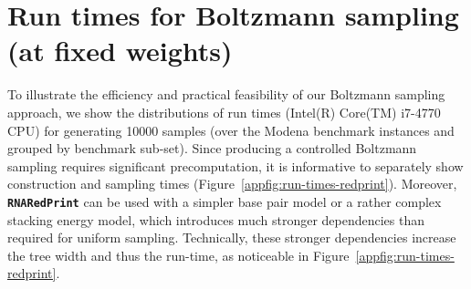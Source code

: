 \documentclass[10pt]{article}
\newcommand{\ourprog}{{\tt \bfseries{}\color{black!85}RNA\textcolor{red!70!black}{Red}Print}}
\newenvironment{revision}{\color{red}}{\color{black}}
\begin{document}
\begin{revision}

\section{Run times for Boltzmann sampling (at fixed weights)}
\label{appsec:run-times}

To illustrate the efficiency and practical feasibility of our Boltzmann sampling approach, we show the distributions of run times (Intel(R) Core(TM) i7-4770 CPU) for generating 10000 samples (over the Modena benchmark instances and grouped by benchmark sub-set). Since producing a controlled Boltzmann sampling requires significant precomputation, it is informative to separately show construction and sampling times (Figure~\ref{appfig:run-times-redprint}). Moreover, \ourprog{} can be used with a simpler base pair model or a rather complex stacking energy model, which introduces much stronger dependencies than required for uniform sampling. Technically, these stronger dependencies increase the tree width and thus the run-time, as noticeable in Figure~\ref{appfig:run-times-redprint}.


\end{revision}
\end{document}

